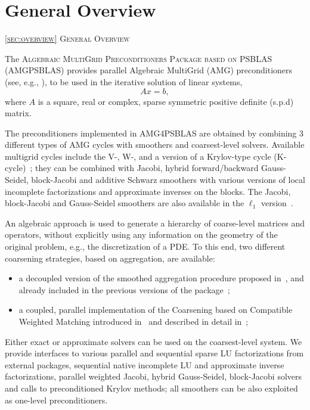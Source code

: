 \section{General Overview\label{sec:overview}}
         {\textsc{\ref{sec:overview} General Overview}}

The \textsc{Algebraic MultiGrid Preconditioners Package based on
PSBLAS} (\textsc{AMG\-PSBLAS}) provides parallel Algebraic MultiGrid (AMG) preconditioners (see, e.g., \cite{Briggs2000,Stuben_01}),
to be used in the iterative solution of  linear systems,
\begin{equation}
Ax=b,
\label{system1}
\end{equation}
where $A$ is a square, real or complex, sparse symmetric positive definite (s.p.d) matrix.
%
%

The preconditioners implemented in AMG4PSBLAS are obtained by combining
3 different types of AMG cycles with smoothers and coarsest-level
solvers. Available multigrid cycles include the V-, W-, and a version of a Krylov-type cycle
(K-cycle)~\cite{Briggs2000,Notay2008}; they can  be
combined with Jacobi, hybrid 
forward/backward Gauss-Seidel, block-Jacobi and additive Schwarz
smoothers with various versions of local incomplete factorizations and approximate inverses 
on the blocks. The Jacobi, block-Jacobi and
Gauss-Seidel smoothers are also available in the $\ell_1$ version~\cite{DDF2020}.

An algebraic approach is used to generate a hierarchy of
coarse-level matrices and operators, without explicitly using any information on the
geometry of the original problem, e.g., the discretization of a PDE. To this end,
two different coarsening strategies, based on aggregation, are available:
\begin{itemize}
\item a decoupled version of the  smoothed aggregation procedure
  proposed in~\cite{BREZINA_VANEK,VANEK_MANDEL_BREZINA}, and already
  included in the previous versions of the
  package~\cite{aaecc_07,MLD2P4_TOMS}; 
\item a coupled,  parallel implementation of the  Coarsening based on
  Compatible Weighted Matching introduced   in~\cite{DV2013,DFV2018}
  and described in detail in~\cite{DDF2020};  
\end{itemize}
Either exact or approximate solvers can be used on the coarsest-level
system. We provide interfaces to various parallel and sequential sparse LU factorizations from external 
packages, sequential native incomplete LU and approximate inverse factorizations,
parallel weighted Jacobi, hybrid Gauss-Seidel, block-Jacobi solvers and
calls to preconditioned Krylov methods;  all 
smoothers can be also exploited as one-level preconditioners.

